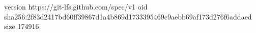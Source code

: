 version https://git-lfs.github.com/spec/v1
oid sha256:2f83d2417bd60ff39867d1a4b869d1733395469c9aebb69af173d276f6addaed
size 174916
